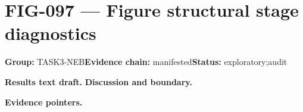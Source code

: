 \clearpage
\section{FIG-097 --- Figure structural stage diagnostics}
\label{figpage:fig-097}
\textbf{Group:} TASK3-NEB\quad \textbf{Evidence chain:} manifested\quad \textbf{Status:} exploratory;audit

\textbf{Results text draft.} 
\textbf{Discussion and boundary.} 


\textbf{Evidence pointers.}



\vfill
